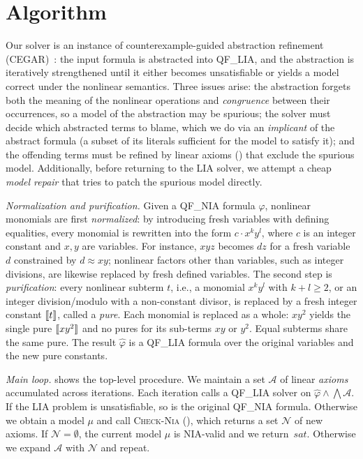 \section{Algorithm}\label{sec:algorithm}

Our solver is an instance of counterexample-guided abstraction refinement
(CEGAR)~\cite{clarke2000cegar}: the input formula is abstracted into QF\_LIA,
and the abstraction is iteratively strengthened until it either becomes
unsatisfiable or yields a model correct under the nonlinear semantics.
Three issues arise: the abstraction forgets both the meaning of the
nonlinear operations and \emph{congruence} between their occurrences, so a
model of the abstraction may be spurious; the solver must decide which
abstracted terms to blame, which we do via an \emph{implicant} of the
abstract formula (a subset of its literals sufficient for the model to
satisfy it); and the offending terms must be refined by linear axioms
() that exclude the spurious model.
Additionally, before returning to the LIA solver, we attempt a cheap
\emph{model repair} that tries to patch the spurious model directly.

\emph{Normalization and purification.}
Given a QF\_NIA formula $\varphi$, nonlinear monomials are first
\emph{normalized}: by introducing fresh variables with defining equalities,
every monomial is rewritten into the form $c \cdot x^k y^l$, where $c$ is an
integer constant and $x, y$ are variables.
For instance, $x y z$ becomes $d z$ for a fresh variable $d$ constrained by
$d \approx x y$; nonlinear factors other than variables, such as integer
divisions, are likewise replaced by fresh defined variables.
The second step is \emph{purification}: every nonlinear subterm $t$, i.e., a
monomial $x^k y^l$ with $k + l \geq 2$, or an integer division/modulo with a
non-constant divisor, is replaced by a fresh integer constant $\llbracket t \rrbracket$,
called a \emph{pure}.
Each monomial is replaced as a whole: $x y^2$ yields the single pure
$\llbracket x y^2 \rrbracket$ and no pures for its sub-terms $x y$ or $y^2$.
Equal subterms share the same pure.
The result $\hat\varphi$ is a QF\_LIA formula over the original variables and
the new pure constants.

\emph{Main loop.}
 shows the top-level procedure.
We maintain a set $\mathcal{A}$ of linear \emph{axioms} accumulated across iterations.
Each iteration calls a QF\_LIA solver on $\hat\varphi \land \bigwedge\mathcal{A}$.
If the LIA problem is unsatisfiable, so is the original QF\_NIA formula.
Otherwise we obtain a model $\mu$ and call \textsc{Check-Nia} (),
which returns a set $\mathcal{N}$ of new axioms.
If $\mathcal{N} = \emptyset$, the current model $\mu$ is NIA-valid and we return~$\mathit{sat}$.
Otherwise we expand $\mathcal{A}$ with $\mathcal{N}$ and repeat.

